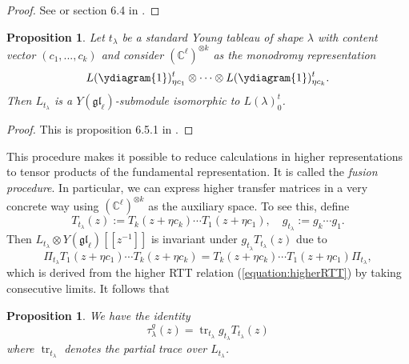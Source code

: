 \documentclass[11pt]{report}
\newtheorem{prop}[theorem]{Proposition}
\theoremstyle{definition}
\theoremstyle{remark}
\theoremstyle{remark}
\newcommand{\C}{\mathbb{C}}
\begin{document}
\begin{proof}
See \cite{article:molev:2008} or section 6.4 in \cite{book:molev}.
\end{proof}

\begin{prop}
Let $t_\lambda$ be a standard Young tableau of shape $\lambda$ with content vector $(c_1,...,c_k)$ and consider $(\C^\ell)^{\otimes k}$ as the monodromy representation
\begin{equation*}
L(\ydiagram{1})_{\eta c_1}^t \otimes \cdots \otimes L(\ydiagram{1})_{\eta c_k}^t.
\end{equation*}
Then $L_{t_\lambda}$ is a $Y(\mathfrak{gl}_\ell)$-submodule isomorphic to $L(\lambda)_0^t$.
\end{prop}

\begin{proof}
This is proposition 6.5.1 in \cite{book:molev}.
\end{proof}

This procedure makes it possible to reduce calculations in higher representations to tensor products of the fundamental representation. It is called the \emph{fusion procedure}. In particular, we can express higher transfer matrices in a very concrete way using $(\C^\ell)^{\otimes k}$ as the auxiliary space. To see this, define
\begin{equation*}
T_{t_\lambda}(z) := T_k(z+\eta c_k) \cdots T_1(z+\eta c_1), \quad g_{t_\lambda} := g_k \cdots g_1.
\end{equation*}
Then $L_{t_\lambda} \otimes Y(\mathfrak{gl}_\ell)[[z^{-1}]]$ is invariant under $g_{t_\lambda} T_{t_\lambda}(z)$ due to
\begin{equation*}
\Pi_{t_\lambda} T_1(z+\eta c_1) \cdots T_k(z+\eta c_k) = T_k(z+\eta c_k) \cdots T_1(z+\eta c_1) \Pi_{t_\lambda},
\end{equation*}
which is derived from the higher RTT relation (\ref{equation:higherRTT}) by taking consecutive limits. It follows that

\begin{prop}
We have the identity
\begin{equation*}
\tau_\lambda^g(z) = \operatorname{tr}_{t_\lambda} g_{t_\lambda} T_{t_\lambda}(z)
\end{equation*}
where $\operatorname{tr}_{t_\lambda}$ denotes the partial trace over $L_{t_\lambda}$.
\end{prop}
\end{document}
